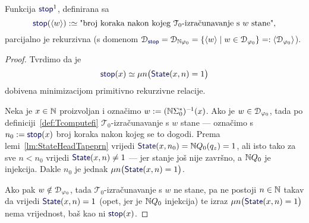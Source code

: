 \begin{lema}[{name=[parcijalna rekurzivnost brojenja koraka do zaustavljanja]}]\label{lm:stopprek}
Funkcija $\f{stop}^1$\!, definirana sa
\begin{equation}
    \f{stop}(\kr w):\simeq\text{"broj koraka nakon kojeg $\mathcal T_0$-izračunavanje s $w$ stane",}
\end{equation}
    parcijalno je rekurzivna (s domenom $\dom{\f{stop}}=\dom{\N\varphi_0}=\{\kr w\mid w\in\dom{\varphi_0}\}=:\kr{\dom{\varphi_0}}$).
\end{lema}
\begin{proof}
Tvrdimo da je
\begin{equation}\label{eq:stopdef}
    \f{stop}(x)\simeq\mu n\bigl(\f{State}(x,n)=1\bigr)
\end{equation}
dobivena minimizacijom primitivno rekurzivne relacije.

	Neka je $x\in{\mathbb N}$ proizvoljan i označimo $w:=({\mathbb N}\Sigma_0^*)^{-\mspace{-2mu}1}(x)$. Ako je $w\in\mathcal D_{\varphi_0}$, tada po definiciji~\ref{def:Tcomputefi} $\mathcal T_0$-izračunavanje s $w$ stane --- označimo s $n_0:=\f{stop}(x)$ broj koraka nakon kojeg se to dogodi. Prema lemi~\ref{lm:StateHeadTapeprn} vrijedi $\f{State}(x,n_0)=\N Q_0(q_z)=1$, ali isto tako za sve $n<n_0$ vrijedi $\f{State}(x,n)\ne 1$ --- jer stanje još nije završno, a ${\mathbb N} Q_0$ je injekcija. Dakle $n_0$ je jednak $\mu n\bigl(\f{State}(x,n)=1\bigr)$.

Ako pak $w\notin\mathcal D_{\varphi_0}$, tada $\mathcal T_0$-izračunavanje s $w$ ne stane, pa ne postoji $n\in{\mathbb N}$ takav da vrijedi $\f{State}(x,n)=1$ (opet, jer je ${\mathbb N} Q_0$ injekcija) te izraz $\mu n\bigl(\f{State}(x,n)=1\bigr)$ nema vrijednost, baš kao ni $\f{stop}(x)$.
\end{proof}


